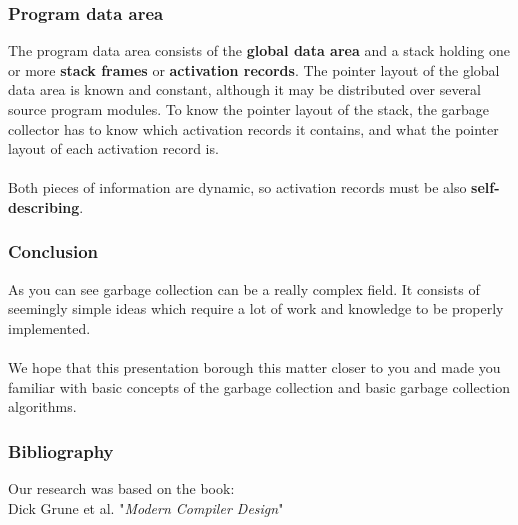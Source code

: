 \documentclass[presentation]{beamer}
\begin{document}
\begin{frame}
    \frametitle{Program data area}
    \justifying
    The program data area consists of the \textbf{global data area} and a stack holding one or more \textbf{stack frames} or \textbf{activation records}. The pointer layout of the global data area is known and constant, although it may be distributed over several source program modules. To know the pointer layout of the stack, the garbage collector has to know which activation records it contains, and what the pointer layout of each activation record is. 
    \\~\\
    Both pieces of information are dynamic, so activation records must be also \textbf{self-describing}.
\end{frame}

\begin{frame}
    \frametitle{Conclusion}
    \justifying
    As you can see garbage collection can be a really complex field. It consists of seemingly simple ideas which require a lot of work and knowledge to be properly implemented.
    \\~\\
    We hope that this presentation borough this matter closer to you and made you familiar with basic concepts of the garbage collection and basic garbage collection algorithms.
\end{frame}

\begin{frame}
    \frametitle{Bibliography}
    \justifying
    Our research was based on the book:\\Dick Grune et al. "\textit{Modern Compiler Design}"
\end{frame}
\end{document}
